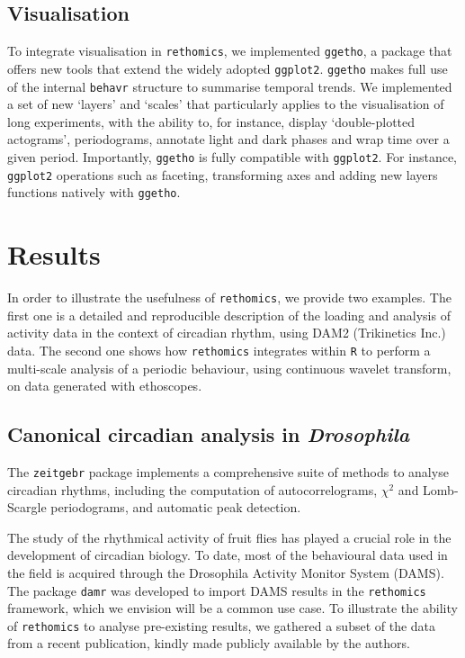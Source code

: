 \documentclass[10pt,letterpaper]{article}\usepackage[]{graphicx}\usepackage[]{color}
\begin{document}
\subsection*{Visualisation}

To integrate visualisation in \texttt{rethomics}, we implemented \texttt{ggetho},
a package that offers new tools that extend the widely adopted \texttt{ggplot2}\cite{wickham_ggplot2_2016}.
\texttt{ggetho} makes full use of the internal \texttt{behavr} structure to summarise temporal trends.
We implemented a set of new `layers' and `scales' that particularly applies to the visualisation of long experiments, with the ability to, for instance, display `double-plotted actograms', periodograms, annotate light and dark phases and wrap time over a given period. 
Importantly, \texttt{ggetho} is fully compatible with \texttt{ggplot2}. 
For instance, \texttt{ggplot2} operations such as faceting, transforming axes and adding new layers functions natively with \texttt{ggetho}.




\section*{Results}

In order to illustrate the usefulness of \texttt{rethomics}, we provide two examples.
The first one is a detailed and reproducible description of the loading and analysis of activity data in the context of circadian rhythm, using DAM2 (Trikinetics Inc.) data.
The second one shows how \texttt{rethomics} integrates within \texttt{R} to perform a multi-scale analysis of a periodic behaviour, using continuous wavelet transform, on data generated with ethoscopes\cite{geissmann_ethoscopes_2017}.

\subsection*{Canonical circadian analysis in \emph{Drosophila}}
The \texttt{zeitgebr} package implements a comprehensive suite of methods to analyse circadian rhythms, 
including the computation of autocorrelograms, $\chi{}^2$\cite{sokolove_chi_1978} and Lomb-Scargle\cite{ruf_lomb-scargle_1999} periodograms,
and automatic peak detection.

The study of the rhythmical activity of fruit flies has played a crucial role in the development of circadian biology\cite{dubowy_circadian_2017}.
To date, most of the behavioural data used in the field is acquired through the Drosophila Activity Monitor System (DAMS).
The package \texttt{damr} was developed to import DAMS results in the \texttt{rethomics} framework, which we envision will be a common use case. 
To illustrate the ability of \texttt{rethomics} to analyse pre-existing results,
we gathered a subset of the data from a recent publication\cite{buhl_quasimodo_2016}, kindly made publicly available by the authors\cite{ogueta_maite_2018_1172980}.
\end{document}
